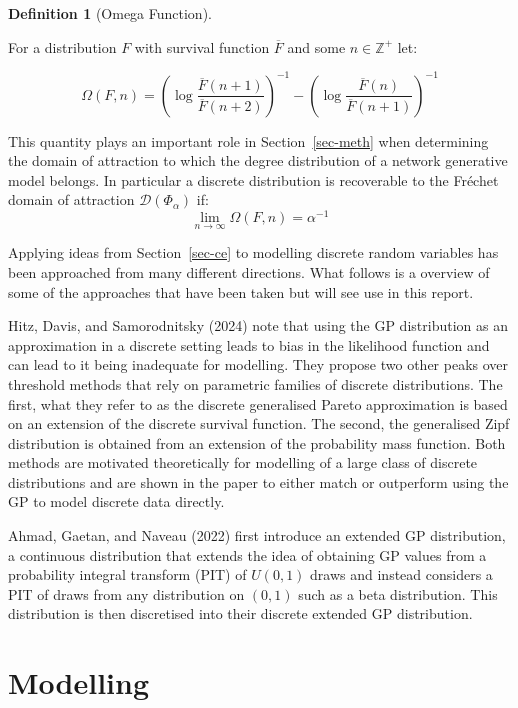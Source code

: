 \documentclass[
  10pt,
  a4paper,
]{scrreprt}
\theoremstyle{plain}
\theoremstyle{plain}
\theoremstyle{plain}
\theoremstyle{definition}
\newtheorem{definition}{Definition}[section]
\theoremstyle{remark}
\begin{document}
{\begin{definition}[Omega
Function]\protect\hypertarget{def-omega}{}\label{def-omega}

For a distribution \(F\) with survival function \(\overline F\) and some
\(n\in\mathbb Z^+\) let:

\[
\Omega(F,n) = \left(\log\displaystyle\frac{\overline F (n+1)}{\overline F (n+2)}\right)^{-1} - \left(\log\displaystyle\frac{\overline F (n)}{\overline F (n+1)}\right)^{-1}
\]

\end{definition}

This quantity plays an important role in Section~\ref{sec-meth} when
determining the domain of attraction to which the degree distribution of
a network generative model belongs. In particular a discrete
distribution is recoverable to the Fréchet domain of attraction
\(\mathcal D(\Phi_\alpha)\) if: \[
\lim_{n\rightarrow\infty}\Omega(F,n) = \alpha^{-1}
\]

Applying ideas from Section~\ref{sec-ce} to modelling discrete random
variables has been approached from many different directions. What
follows is a overview of some of the approaches that have been taken but
will see use in this report.

Hitz, Davis, and Samorodnitsky (2024) note that using the GP
distribution as an approximation in a discrete setting leads to bias in
the likelihood function and can lead to it being inadequate for
modelling. They propose two other peaks over threshold methods that rely
on parametric families of discrete distributions. The first, what they
refer to as the discrete generalised Pareto approximation is based on an
extension of the discrete survival function. The second, the generalised
Zipf distribution is obtained from an extension of the probability mass
function. Both methods are motivated theoretically for modelling of a
large class of discrete distributions and are shown in the paper to
either match or outperform using the GP to model discrete data directly.

Ahmad, Gaetan, and Naveau (2022) first introduce an extended GP
distribution, a continuous distribution that extends the idea of
obtaining GP values from a probability integral transform (PIT) of
\(U(0,1)\) draws and instead considers a PIT of draws from any
distribution on \((0,1)\) such as a beta distribution. This distribution
is then discretised into their discrete extended GP distribution.

\hypertarget{sec-mod}{%
\section{Modelling}\label{sec-mod}}

}
\end{document}
